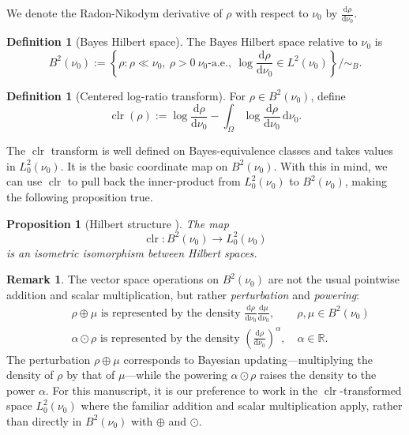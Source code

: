 \documentclass{article}
\newtheorem{proposition}[theorem]{Proposition}
\theoremstyle{definition}
\newtheorem{definition}[theorem]{Definition}
\newtheorem{remark}[theorem]{Remark}
\DeclareMathOperator{\clr}{clr}
\renewcommand{\d}{\mathrm{d}}
\begin{document}
We denote the Radon-Nikodym derivative of $\rho$ with respect to $\nu_0$ by $\frac{\d \rho}{\d \nu_0}$.

\begin{definition}[Bayes Hilbert space]
    The Bayes Hilbert space relative to \(\nu_0\) is
    \[
        B^2(\nu_0)
        :=
        \left\{
        \rho : \rho \ll \nu_0,\ \rho>0\ \nu_0\text{-a.e.},\
        \log \frac{\d\rho}{\d\nu_0}\in L^2(\nu_0)
        \right\}\Big/\sim_B.
    \]
\end{definition}

\begin{definition}[Centered log-ratio transform]
    For \(\rho\in B^2(\nu_0)\), define
    \[
        \clr(\rho)
        :=
        \log \frac{\d\rho}{\d\nu_0}
        -
        \int_\Omega \log \frac{\d\rho}{\d\nu_0}\,\d\nu_0.
    \]
\end{definition}

The \(\clr\) transform is well defined on Bayes-equivalence classes and takes values in
\(L^2_0(\nu_0)\). It is the basic coordinate map on \(B^2(\nu_0)\). With this in mind, we can use $\clr$ to pull back the inner-product from $L^2_0(\nu_0)$ to $B^2(\nu_0)$, making the following proposition true.

\begin{proposition}[Hilbert structure \citep{van_den_boogaart_bayes_2014}]
    The map
    \[
        \clr : B^2(\nu_0)\to L^2_0(\nu_0)
    \]
    is an isometric isomorphism between Hilbert spaces.
\end{proposition}

\begin{remark}
    The vector space operations on $B^2(\nu_0)$ are not the usual pointwise addition and scalar multiplication, but rather \emph{perturbation} and \emph{powering}:
    \begin{align*}
        & \rho \oplus \mu \text{ is represented by the density } \frac{\d \rho}{\d \nu_0} \frac{\d \mu}{\d \nu_0}, \qquad  \rho, \mu \in B^2(\nu_0) \\
        \qquad
        & \alpha \odot \rho \text{ is represented by the density } \left( \frac{\d \rho}{\d \nu_0} \right)^\alpha, \quad \alpha \in \mathbb{R}.
    \end{align*}
    The perturbation $\rho \oplus \mu$ corresponds to Bayesian updating---multiplying the density of $\rho$ by that of $\mu$---while the powering $\alpha \odot \rho$ raises the density to the power $\alpha$.
    For this manuscript, it is our preference to work in the $\clr$-transformed space $L^2_0(\nu_0)$ where the familiar addition and scalar multiplication apply, rather than directly in $B^2(\nu_0)$ with $\oplus$ and $\odot$.
\end{remark}
\end{document}
